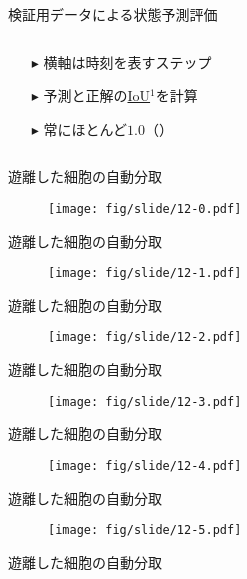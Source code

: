 \begin{frame}{検証用データによる状態予測評価}
\begin{columns}
\begin{column}{.4\linewidth}
\begin{itemize}
                \item[$\blacktriangleright$] 横軸は時刻を表すステップ
                \item[$\blacktriangleright$] 予測と正解の\uline{IoU}$^1$を計算
                \item[$\blacktriangleright$] 常にほとんど$1.0$（）
            \end{itemize}
        \end{column}
    \end{columns}
    \vspace{0.5zh}
\end{frame}

\begin{frame}{遊離した細胞の自動分取}
    \begin{figure}[t]
        \centering
        \texttt{[image: fig/slide/12-0.pdf]}
    \end{figure}
\end{frame}
\begin{frame}[noframenumbering]{遊離した細胞の自動分取}
    \begin{figure}[t]
        \centering
        \texttt{[image: fig/slide/12-1.pdf]}
    \end{figure}
\end{frame}
\begin{frame}[noframenumbering]{遊離した細胞の自動分取}
    \begin{figure}[t]
        \centering
        \texttt{[image: fig/slide/12-2.pdf]}
    \end{figure}
\end{frame}
\begin{frame}[noframenumbering]{遊離した細胞の自動分取}
    \begin{figure}[t]
        \centering
        \texttt{[image: fig/slide/12-3.pdf]}
    \end{figure}
\end{frame}
\begin{frame}[noframenumbering]{遊離した細胞の自動分取}
    \begin{figure}[t]
        \centering
        \texttt{[image: fig/slide/12-4.pdf]}
    \end{figure}
\end{frame}
\begin{frame}[noframenumbering]{遊離した細胞の自動分取}
    \begin{figure}[t]
        \centering
        \texttt{[image: fig/slide/12-5.pdf]}
    \end{figure}
\end{frame}
\begin{frame}[noframenumbering]{遊離した細胞の自動分取}
\end{frame}

